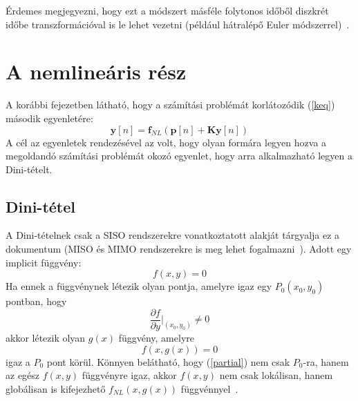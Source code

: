 Érdemes megjegyezni, hogy ezt a módszert másféle folytonos időből diszkrét időbe transzformációval 
is le lehet vezetni (például hátralépő Euler módszerrel)~\cite{borin}.

\section{A nemlineáris rész}
A korábbi fejezetben látható, hogy a számítási problémát korlátozódik (\ref{keq}) második 
egyenletére:
\begin{equation}
    \mathbf{y}[n]=\mathbf{f}_{NL}(\mathbf{p}[n]+\mathbf{Ky}[n])
   \label{nonlineq}
\end{equation}
A cél az egyenletek rendezésével az volt, hogy olyan formára legyen hozva a megoldandó számítási 
problémát okozó egyenlet, hogy arra alkalmazható legyen a Dini-tételt.
\subsection{Dini-tétel}\label{dini}
A Dini-tételnek csak a SISO rendszerekre vonatkoztatott alakját tárgyalja ez a dokumentum (MISO és 
MIMO rendszerekre is meg lehet fogalmazni~\cite{borin}). Adott egy implicit függvény: 
\begin{equation}
    f(x,y)=0
\end{equation}
Ha ennek a függvénynek létezik olyan pontja, amelyre igaz egy $P_0(x_0, y_0)$ pontban, hogy
\begin{equation}
    \frac{\partial{f}}{\partial{y}}\biggr |_{(x_0, y_0)} \neq 0
   \label{partial}
\end{equation}
akkor létezik olyan $g(x)$ függvény, amelyre
\begin{equation}
    f(x, g(x))=0
\end{equation}
igaz a $P_0$ pont körül. Könnyen belátható, hogy (\ref{partial}) nem csak $P_0$-ra, hanem az egész 
$f(x,y)$ függvényre igaz, akkor $f(x,y)$ nem csak lokálisan, hanem globálisan is kifejezhető 
$f_{NL}(x,g(x))$ függvénnyel~\cite{borin}.

